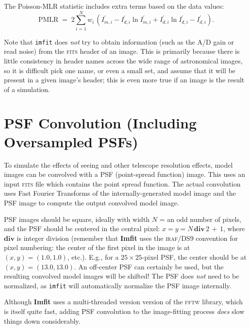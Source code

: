 \documentclass[10pt,a4paper,article]{memoir}
\newcommand{\imfit}{\textbf{Imfit}}
\newcommand{\imfitprog}{\texttt{imfit}}
\newcommand{\pmlr}{PMLR}
\begin{document}
The Poisson-MLR statistic includes extra terms based on the data values:
\begin{equation}
\mathrm{\pmlr} \; = \;  2 \sum_{i = 1}^{N} w_{i} \, 
\left( I^{\prime}_{m, i} - I^{\prime}_{d, i} \ln I^{\prime}_{m, i} + I^{\prime}_{d, i} \ln I^{\prime}_{d, i} - I^{\prime}_{d, i} \right).
\end{equation}

Note that \imfitprog{} does \textit{not} try to obtain information (such as
the A/D gain or read noise) from the \textsc{fits} header of an image. This is primarily
because there is little consistency in header names across the wide range of
astronomical images, so it is difficult pick one name, or even a small set, and
assume that it will be present in a given image's header; this is even more
true if an image is the result of a simulation.




\section{PSF Convolution (Including Oversampled PSFs)}

To simulate the effects of seeing and other telescope resolution effects, model
images can be convolved with a PSF (point-spread function) image. This uses an
input \textsc{fits} file which contains the point spread function. The actual convolution
uses Fast Fourier Transforms of the internally-generated model image and the PSF
image to compute the output convolved model image.

PSF images should be square, ideally with width $N$ = an odd number of
pixels, and the PSF should be centered in the central pixel: $x = y = N \,
\mathbf{div} \, 2 \, + \, 1$, where $\mathbf{div}$ is integer division (remember
that \imfit{} uses the \textsc{iraf}/DS9 convention for pixel numbering: the center
of the first pixel in the image is at $(x,y) = (1.0,1.0)$, etc.).
E.g., for a $25 \times 25$-pixel PSF, the center should be at $(x,y) =
(13.0,13.0)$. An off-center PSF can certainly be used, but the resulting
convolved model images will be shifted! The PSF does \textit{not} need
to be normalized, as \imfitprog{} will automatically normalize the PSF
image internally.

Although \imfit{} uses a multi-threaded version version of the
\textsc{fftw} library, which is itself quite fast, adding PSF
convolution to the image-fitting process \textit{does} slow things down
considerably.
\end{document}
